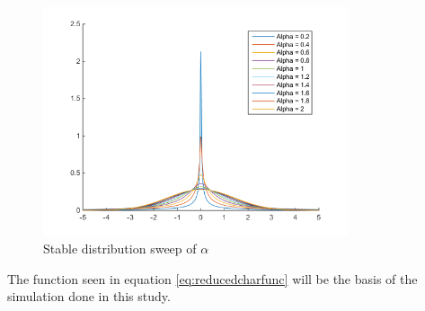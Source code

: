 \begin{figure}[H]
\centering
\includegraphics[width = 0.8\textwidth]{billeder/stblpdfsweep}
\caption{Stable distribution sweep of $\alpha$}
\label{fig:stablepdfsweep}
\end{figure}
The function seen in equation \ref{eq:reducedcharfunc} will be the basis of the simulation done in this study.


 
